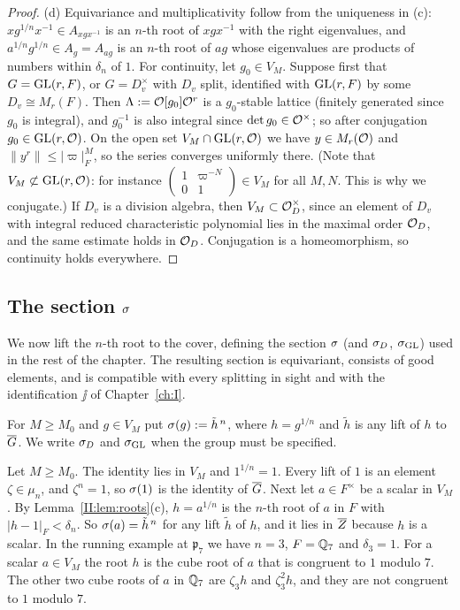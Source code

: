 \begin{proof}
(d) Equivariance and multiplicativity follow from the uniqueness in (c): $xg^{1/n}x^{-1}\in A_{xgx^{-1}}$ is an $n$-th root of $xgx^{-1}$ with the right eigenvalues, and $a^{1/n}g^{1/n}\in A_g=A_{ag}$ is an $n$-th root of $ag$ whose eigenvalues are products of numbers within $\delta_n$ of $1$. For continuity, let $g_0\in V_M$. Suppose first that $G=\mathrm{GL}(r,F)$, or $G=D_v^\times$ with $D_v$ split, identified with $\mathrm{GL}(r,F)$ by some $D_v\cong M_r(F)$. Then $\Lambda:=\mathcal{O}[g_0]\mathcal{O}^r$ is a $g_0$-stable lattice (finitely generated since $g_0$ is integral), and $g_0^{-1}$ is also integral since $\det g_0\in\mathcal{O}^\times$; so after conjugation $g_0\in\mathrm{GL}(r,\mathcal{O})$. On the open set $V_M\cap\mathrm{GL}(r,\mathcal{O})$ we have $y\in M_r(\mathcal{O})$ and $\|y^r\|\le|\varpi|_F^M$, so the series converges uniformly there. (Note that $V_M\not\subset\mathrm{GL}(r,\mathcal{O})$: for instance $\left(\begin{smallmatrix}1&\varpi^{-N}\\0&1\end{smallmatrix}\right)\in V_M$ for all $M,N$. This is why we conjugate.) If $D_v$ is a division algebra, then $V_M\subset\mathcal{O}_D^\times$, since an element of $D_v$ with integral reduced characteristic polynomial lies in the maximal order $\mathcal{O}_D$, and the same estimate holds in $\mathcal{O}_D$. Conjugation is a homeomorphism, so continuity holds everywhere.
\end{proof}


\subsection{The section $\sigma$}\label{II:subsec:section}
We now lift the $n$-th root to the cover, defining the section $\sigma$ (and $\sigma_D$, $\sigma_{\mathrm{GL}}$) used in the rest of the chapter. The resulting section is equivariant, consists of good elements, and is compatible with every splitting in sight and with the identification $\jj$ of Chapter~\ref{ch:I}.

\begin{definition}
For $M\ge M_0$ and $g\in V_M$ put $\sigma(g):=\tilde h^{\,n}$, where $h=g^{1/n}$ and $\tilde h$ is any lift of $h$ to $\overline{G}$. We write $\sigma_D$ and $\sigma_{\mathrm{GL}}$ when the group must be specified.
\end{definition}

\begin{example}\label{II:ex:section}
Let $M\ge M_0$. The identity lies in $V_M$ and $1^{1/n}=1$. Every lift of $1$ is an element $\zeta\in\mu_n$, and $\zeta^n=1$, so $\sigma(1)$ is the identity of $\overline{G}$. Next let $a\in F^\times$ be a scalar in $V_M$. By Lemma~\ref{II:lem:roots}(c), $h=a^{1/n}$ is the $n$-th root of $a$ in $F$ with $|h-1|_F<\delta_n$. So $\sigma(a)=\tilde h^{\,n}$ for any lift $\tilde h$ of $h$, and it lies in $\overline{Z}$ because $h$ is a scalar. In the running example at $\mathfrak p_7$ we have $n=3$, $F=\mathbb{Q}_7$ and $\delta_3=1$. For a scalar $a\in V_M$ the root $h$ is the cube root of $a$ that is congruent to $1$ modulo $7$. The other two cube roots of $a$ in $\mathbb{Q}_7$ are $\zeta_3h$ and $\zeta_3^2h$, and they are not congruent to $1$ modulo $7$.
\end{example}


